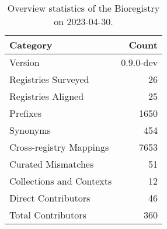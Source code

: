 \begin{table}
\caption{Overview statistics of the Bioregistry on 2023-04-30.}
\label{tab:bioregistry-summary}
\begin{tabular}{lr}
\toprule
Category & Count \\
\midrule
Version & 0.9.0-dev \\
Registries Surveyed & 26 \\
Registries Aligned & 25 \\
Prefixes & 1650 \\
Synonyms & 454 \\
Cross-registry Mappings & 7653 \\
Curated Mismatches & 51 \\
Collections and Contexts & 12 \\
Direct Contributors & 46 \\
Total Contributors & 360 \\
\bottomrule
\end{tabular}
\end{table}
